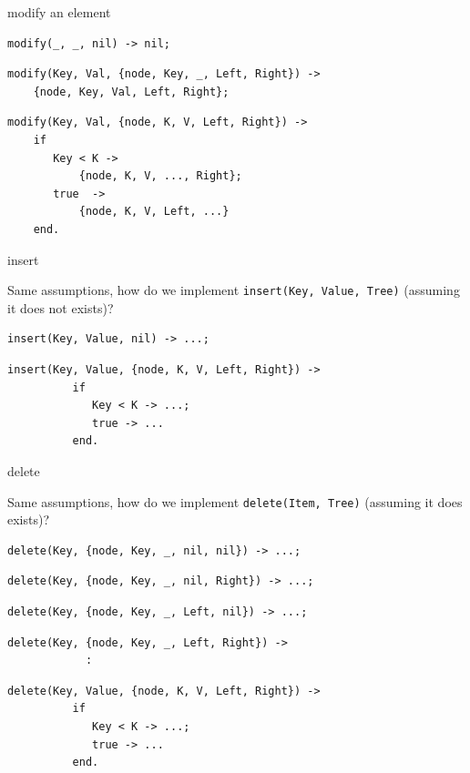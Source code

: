 \begin{frame}[fragile]{modify an element}

\begin{verbatim}
modify(_, _, nil) -> nil;
\end{verbatim}
\pause
\begin{verbatim}
modify(Key, Val, {node, Key, _, Left, Right}) -> 
    {node, Key, Val, Left, Right};
\end{verbatim}
\pause
\begin{verbatim}
modify(Key, Val, {node, K, V, Left, Right}) -> 
    if 
       Key < K ->  
           {node, K, V, ..., Right};
       true  -> 
           {node, K, V, Left, ...}
    end.
\end{verbatim}

\end{frame}


\begin{frame}[fragile]{insert}

Same assumptions, how do we implement {\tt insert(Key, Value, Tree)} (assuming it does not exists)?

\pause\vspace{20pt}

\begin{verbatim}
insert(Key, Value, nil) -> ...;
\end{verbatim}
\pause
\begin{verbatim}
insert(Key, Value, {node, K, V, Left, Right}) -> 
          if 
             Key < K -> ...;
             true -> ...
          end.
\end{verbatim}

\end{frame}


\begin{frame}[fragile]{delete}

Same assumptions, how do we implement {\tt delete(Item, Tree)} (assuming it does exists)?

\pause\vspace{20pt}

\begin{verbatim}
delete(Key, {node, Key, _, nil, nil}) -> ...;
\end{verbatim}
\pause
\begin{verbatim}
delete(Key, {node, Key, _, nil, Right}) -> ...;
\end{verbatim}
\pause
\begin{verbatim}
delete(Key, {node, Key, _, Left, nil}) -> ...;
\end{verbatim}
\pause
\begin{verbatim}
delete(Key, {node, Key, _, Left, Right}) -> 
            :
\end{verbatim}
\pause
\begin{verbatim}
delete(Key, Value, {node, K, V, Left, Right}) -> 
          if 
             Key < K -> ...;
             true -> ...
          end.
\end{verbatim}
\end{frame}

